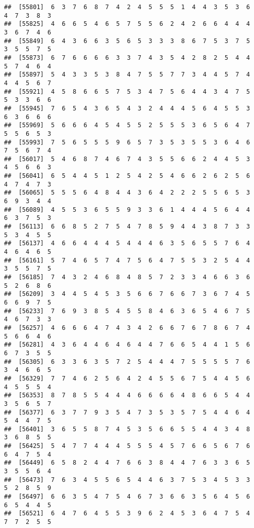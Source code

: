 \documentclass[
]{book}
\begin{document}
\begin{verbatim}
##  [55801]  6  3  7  6  8  7  4  2  4  5  5  5  1  4  4  3  5  3  6  4  7  3  8  3
##  [55825]  4  6  6  5  4  6  5  7  5  5  6  2  4  2  6  6  4  4  4  3  6  7  4  6
##  [55849]  6  4  3  6  6  3  5  6  5  3  3  3  8  6  7  5  3  7  5  3  5  5  7  5
##  [55873]  6  7  6  6  6  6  3  3  7  4  3  5  4  2  8  2  5  4  4  5  7  4  6  4
##  [55897]  5  4  3  3  5  3  8  4  7  5  5  7  7  3  4  4  5  7  4  4  4  5  6  7
##  [55921]  4  5  8  6  6  5  7  5  3  4  7  5  6  4  4  3  4  7  5  5  3  3  6  6
##  [55945]  7  6  5  4  3  6  5  4  3  2  4  4  4  5  6  4  5  5  3  6  3  6  6  6
##  [55969]  5  6  6  6  4  5  4  5  5  2  5  5  5  3  6  5  6  4  7  5  5  6  5  3
##  [55993]  7  5  6  5  5  5  9  6  5  7  3  5  3  5  5  3  6  4  6  7  5  6  7  4
##  [56017]  5  4  6  8  7  4  6  7  4  3  5  5  6  6  2  4  4  5  3  4  5  6  6  3
##  [56041]  6  5  4  4  5  1  2  5  4  2  5  4  6  6  2  6  2  5  6  4  7  4  7  3
##  [56065]  5  5  5  6  4  8  4  4  3  6  4  2  2  2  5  5  6  5  3  6  9  3  4  4
##  [56089]  4  5  5  3  6  5  5  9  3  3  6  1  4  4  4  5  6  4  4  6  3  7  5  3
##  [56113]  6  6  8  5  2  7  5  4  7  8  5  9  4  4  3  8  7  3  3  5  3  4  5  5
##  [56137]  4  6  6  4  4  4  5  4  4  4  6  3  5  6  5  5  7  6  4  4  6  4  6  5
##  [56161]  5  7  4  6  5  7  4  7  5  6  4  7  5  5  3  2  5  4  4  3  5  5  7  5
##  [56185]  7  4  3  2  4  6  8  4  8  5  7  2  3  3  4  6  6  3  6  5  2  6  8  6
##  [56209]  3  4  4  5  4  5  3  5  6  6  7  6  6  7  3  6  7  4  5  6  6  9  7  5
##  [56233]  7  6  9  3  8  5  4  5  5  8  4  6  3  6  5  4  6  7  5  4  6  7  3  3
##  [56257]  4  6  6  6  4  7  4  3  4  2  6  6  7  6  7  8  6  7  4  5  6  6  4  6
##  [56281]  4  3  6  4  4  6  4  6  4  4  7  6  6  5  4  4  1  5  6  6  7  3  5  5
##  [56305]  6  3  3  6  3  5  7  2  5  4  4  4  7  5  5  5  5  7  6  3  4  6  6  5
##  [56329]  7  7  4  6  2  5  6  4  2  4  5  5  6  7  5  4  4  5  6  4  5  5  5  4
##  [56353]  8  7  8  5  5  4  4  4  6  6  6  6  4  8  6  6  5  4  4  3  5  6  5  7
##  [56377]  6  3  7  7  9  3  5  4  7  3  5  3  5  7  5  4  4  6  4  5  4  4  7  5
##  [56401]  3  6  5  5  8  7  4  5  3  5  6  6  5  5  4  4  3  4  8  3  6  8  5  5
##  [56425]  5  4  7  7  4  4  4  5  5  5  4  5  7  6  6  5  6  7  6  6  4  7  5  4
##  [56449]  6  5  8  2  4  4  7  6  6  3  8  4  4  7  6  3  3  6  5  3  5  5  6  4
##  [56473]  7  6  3  4  5  5  6  5  4  4  6  3  7  5  3  4  5  3  3  5  2  8  5  9
##  [56497]  6  6  3  5  4  7  5  4  6  7  3  6  6  3  5  6  4  5  6  6  5  4  4  5
##  [56521]  6  4  7  6  4  5  5  3  9  6  2  4  5  3  6  4  7  5  4  7  7  2  5  5

\end{verbatim}
\end{document}

